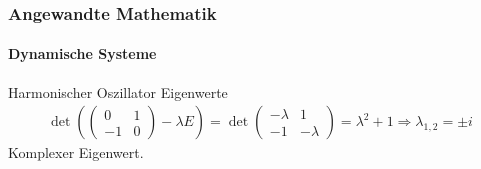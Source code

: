 \documentclass{beamer}
\begin{document}
 \begin{frame}
    \frametitle{Angewandte Mathematik}
\framesubtitle{Dynamische Systeme }

\begin{block}{Harmonischer Oszillator Eigenwerte}
    \begin{align*}
    \det (\begin{pmatrix}
        0 & 1  \\ -1 & 0
    \end{pmatrix} - \lambda E) = 
    \det \begin{pmatrix}
        -\lambda & 1  \\ -1 & -\lambda  
    \end{pmatrix} = \lambda^2 +1 \Rightarrow \lambda_{1,2} = \pm i
\end{align*}
Komplexer Eigenwert.
 \end{block}
 \end{frame}
\end{document}
